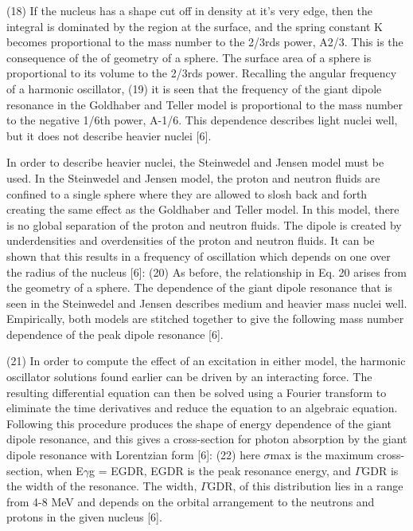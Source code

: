     (18)
    If the nucleus has a shape cut off in density at it's very edge, then the integral is dominated  by the region at the surface, and the spring constant K becomes proportional to the mass number to the 2/3rds power, A2/3.
    This is the consequence of the of geometry of a sphere.
    The surface area of a sphere is proportional to its volume to the 2/3rds power.
    Recalling the angular frequency of a harmonic oscillator,
    (19)
    it is seen that the frequency of the giant dipole resonance in the Goldhaber and Teller model is proportional to the mass number to the negative 1/6th power, A-1/6.
    This dependence describes light nuclei well, but it does not describe heavier nuclei [6].

    In order to describe heavier nuclei, the Steinwedel and Jensen model must be used.
    In the  Steinwedel and Jensen model, the proton and neutron fluids are confined to a single sphere where they are allowed to slosh back and forth creating the same effect as the Goldhaber and Teller model.
    In this model, there is no global separation of the proton and neutron fluids.
    The dipole is created by underdensities and overdensities of the proton and neutron fluids.
    It can be shown that this results in a frequency of oscillation which depends on one over the radius of the nucleus [6]:
    (20)
    As before, the relationship in Eq.
    20 arises from the geometry of a sphere.
    The dependence of the giant dipole resonance that is seen in the Steinwedel and Jensen describes medium and heavier mass nuclei well.
    Empirically, both models are stitched together to give the following mass number dependence of the peak dipole resonance [6].

    (21)
    In order to compute the effect of an excitation in either model, the harmonic oscillator solutions found earlier can be driven by an interacting force.
    The resulting differential equation can then be solved using a Fourier transform to eliminate the time derivatives and reduce the equation to an algebraic equation.
    Following this procedure produces the shape of energy dependence of the giant dipole resonance, and this gives a cross-section for photon absorption by the giant dipole resonance with Lorentzian form [6]:
    (22)
    here $\sigma$max is the maximum cross-section, when E$\gamma$g = EGDR, EGDR is the peak resonance energy, and $\Gamma$GDR is the width of the resonance.
    The width, $\Gamma$GDR, of this distribution lies in a range from 4-8 MeV and depends on the orbital arrangement to the neutrons and protons in the given nucleus [6].
    
